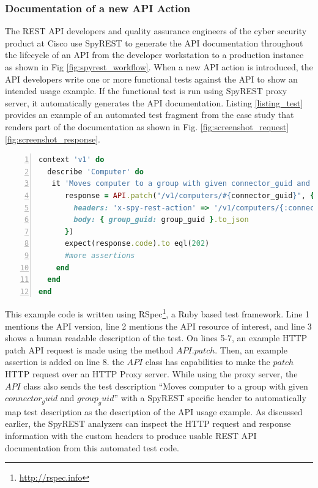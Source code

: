\subsubsection{Documentation of a new API Action}

The REST API developers and quality assurance engineers of the cyber security product at Cisco use SpyREST to generate the API documentation throughout the lifecycle of an API from the developer workstation to a production instance as shown in Fig \ref{fig:spyrest_workflow}. When a new API action is introduced, the API developers write one or more functional tests against the API to show an intended usage example. If the functional test is run using SpyREST proxy server, it automatically generates the API documentation. Listing \ref{listing_test} provides an example of an automated test fragment from the case study that renders part of the documentation as shown in Fig. \ref{fig:screenshot_request} \ref{fig:screenshot_response}.

\lstset{basicstyle=\footnotesize}
\begin{lstlisting}[language=Ruby,breaklines=true,showspaces=false,showstringspaces=false,numbers=left,xleftmargin=2em,caption={Functional Test Code},label=listing_test]
context 'v1' do
  describe 'Computer' do
   it 'Moves computer to a group with given connector_guid and group_guid' do
      response = API.patch("/v1/computers/#{connector_guid}", {
        headers: 'x-spy-rest-action' => '/v1/computers/{:connector_guid}',
        body: { group_guid: group_guid }.to_json
      })
      expect(response.code).to eql(202)
      #more assertions
    end
  end
end
\end{lstlisting}

This example code is written using RSpec\footnote{\url{http://rspec.info}}, a Ruby based test framework. Line 1 mentions the API version, line 2 mentions the API resource of interest, and line 3 shows a human readable description of the test. On lines 5-7, an example HTTP patch API request is made using the method $API.patch$. Then, an example assertion is added on line 8. the $API$ class has capabilities to make the $patch$ HTTP request over an HTTP Proxy server. While using the proxy server, the $API$ class also sends the test description ``Moves computer to a group with given $connector_guid$ and $group_guid$'' with a SpyREST specific header to automatically map test description as the description of the API usage example. As discussed earlier, the SpyREST analyzers can inspect the HTTP request and response information with the custom headers to produce usable REST API documentation from this automated test code.

